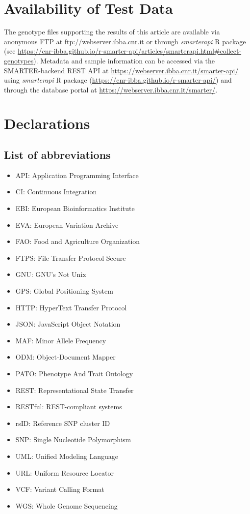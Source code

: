 \documentclass[a4paper,num-refs,gigabyte]{oup-contemporary}
\begin{document}
\section{Availability of Test Data}

The genotype files supporting the results of this article are available via anonymous FTP at \url{ftp://webserver.ibba.cnr.it} or through \emph{smarterapi} R package (see \url{https://cnr-ibba.github.io/r-smarter-api/articles/smarterapi.html#collect-genotypes}). Metadata and sample information can be accessed via the SMARTER-backend REST API at \url{https://webserver.ibba.cnr.it/smarter-api/} using \emph{smarterapi} R package (\url{https://cnr-ibba.github.io/r-smarter-api/}) and through the database portal at \url{https://webserver.ibba.cnr.it/smarter/}.

\section{Declarations}

\subsection{List of abbreviations}

\begin{itemize}
\item API: Application Programming Interface
\item CI: Continuous Integration
\item EBI: European Bioinformatics Institute
\item EVA: European Variation Archive
\item FAO: Food and Agriculture Organization
\item FTPS: File Transfer Protocol Secure
\item GNU: GNU's Not Unix
\item GPS: Global Positioning System
\item HTTP: HyperText Transfer Protocol
\item JSON: JavaScript Object Notation
\item MAF: Minor Allele Frequency
\item ODM: Object-Document Mapper
\item PATO: Phenotype And Trait Ontology
\item REST: Representational State Transfer
\item RESTful: REST-compliant systems
\item rsID: Reference SNP cluster ID
\item SNP: Single Nucleotide Polymorphism
\item UML: Unified Modeling Language
\item URL: Uniform Resource Locator
\item VCF: Variant Calling Format
\item WGS: Whole Genome Sequencing
\end{itemize}
\end{document}
